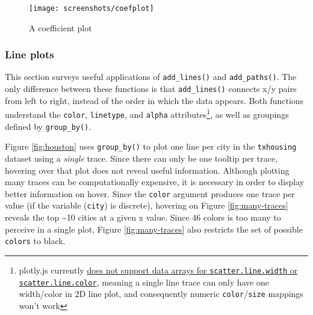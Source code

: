 \documentclass[12pt,]{isuthesis}
\newenvironment{Shaded}{\begin{snugshade}}{\end{snugshade}}
\newcommand{\KeywordTok}[1]{\textcolor[rgb]{0.13,0.29,0.53}{\textbf{{#1}}}}
\newcommand{\DataTypeTok}[1]{\textcolor[rgb]{0.13,0.29,0.53}{{#1}}}
\newcommand{\DecValTok}[1]{\textcolor[rgb]{0.00,0.00,0.81}{{#1}}}
\newcommand{\StringTok}[1]{\textcolor[rgb]{0.31,0.60,0.02}{{#1}}}
\newcommand{\CommentTok}[1]{\textcolor[rgb]{0.56,0.35,0.01}{\textit{{#1}}}}
\newcommand{\NormalTok}[1]{{#1}}
\let\rmarkdownfootnote\footnote%
\def\footnote{\protect\rmarkdownfootnote}
\begin{document}
\begin{Shaded}
\end{Shaded}

\begin{figure}
\centering
\texttt{[image: screenshots/coefplot]}
\caption{\label{fig:coefplot}A coefficient plot}
\end{figure}

\hypertarget{line-plots}{\subsubsection{Line plots}\label{line-plots}}

This section surveys useful applications of \texttt{add\_lines()} and
\texttt{add\_paths()}. The only difference between these functions is
that \texttt{add\_lines()} connects x/y pairs from left to right,
instead of the order in which the data appears. Both functions
understand the \texttt{color}, \texttt{linetype}, and \texttt{alpha}
attributes\footnote{plotly.js currently
  \href{https://github.com/plotly/plotly.js/issues/147}{does not support
  data arrays for \texttt{scatter.line.width} or
  \texttt{scatter.line.color}}, meaning a single line trace can only
  have one width/color in 2D line plot, and consequently numeric
  \texttt{color}/\texttt{size} mappings won't work}, as well as
groupings defined by \texttt{group\_by()}.

Figure \ref{fig:houston} uses \texttt{group\_by()} to plot one line per
city in the \texttt{txhousing} dataset using a \emph{single} trace.
Since there can only be one tooltip per trace, hovering over that plot
does not reveal useful information. Although plotting many traces can be
computationally expensive, it is necessary in order to display better
information on hover. Since the \texttt{color} argument produces one
trace per value (if the variable (\texttt{city}) is discrete), hovering
on Figure \ref{fig:many-traces} reveals the top \textasciitilde{}10
cities at a given x value. Since 46 colors is too many to perceive in a
single plot, Figure \ref{fig:many-traces} also restricts the set of
possible \texttt{colors} to black.
\end{document}

